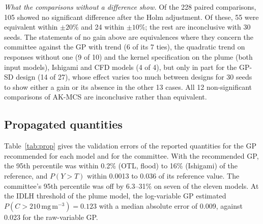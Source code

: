 \emph{What the comparisons without a difference show.} Of the 228 paired
comparisons, 105 showed no significant difference after the Holm
adjustment. Of these, 55 were equivalent within $\pm20\%$ and 24 within
$\pm10\%$; the rest are inconclusive with 30 seeds. The statements of no
gain above are equivalences where they concern the committee against the
GP with trend (6 of its 7 ties), the quadratic trend on responses without
one (9 of 10) and the kernel specification on the plume (both input
models), Ishigami and CFD models (4 of 4), but only in part for the GP-SD design (14 of 27), whose
effect varies too much between designs for 30 seeds to show either a gain
or its absence in the other 13 cases. All 12 non-significant comparisons of
AK-MCS are inconclusive rather than equivalent.

\subsection{Propagated quantities}
Table~\ref{tab:prop} gives the validation errors of the reported quantities
for the GP recommended for each model and for the committee. With the
recommended GP, the 95th percentile was within 0.2\% (OTL, flood) to 16\%
(Ishigami) of the reference, and $P(Y>T)$ within 0.0013 to 0.036 of its
reference value. The committee's 95th percentile was off by 6.3--31\% on
seven of the eleven models. At the IDLH threshold of the plume
model, the log-variable GP estimated $P(C>210\,\mathrm{mg\,m^{-3}})=0.123$
with a median absolute error of 0.009, against 0.023 for the raw-variable
GP.

